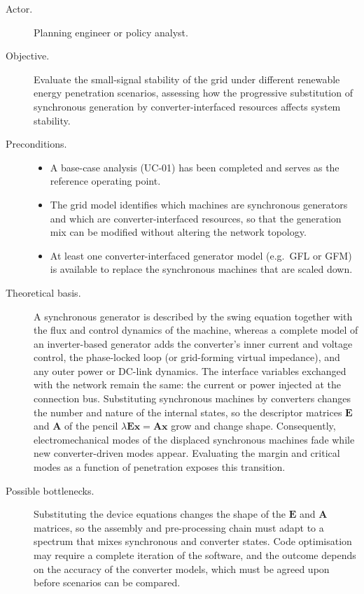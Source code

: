 \begin{description}
  \item[Actor.] Planning engineer or policy analyst.
  \item[Objective.] Evaluate the small-signal stability of the grid under different renewable energy penetration scenarios, assessing how the progressive substitution of synchronous generation by converter-interfaced resources affects system stability.
  \item[Preconditions.]
        \begin{itemize}[before=\leavevmode, leftmargin=*]
          \item A base-case analysis (UC-01) has been completed and serves as the reference operating point.
          \item The grid model identifies which machines are synchronous generators and which are converter-interfaced resources, so that the generation mix can be modified without altering the network topology.
          \item At least one converter-interfaced generator model (e.g.\ GFL or GFM) is available to replace the synchronous machines that are scaled down.
        \end{itemize}
  \item[Theoretical basis.] A synchronous generator is described by the swing equation together with the flux and control dynamics of the machine, whereas a complete model of an inverter-based generator adds the converter's inner current and voltage control, the phase-locked loop (or grid-forming virtual impedance), and any outer power or DC-link dynamics. The interface variables exchanged with the network remain the same: the current or power injected at the connection bus. Substituting synchronous machines by converters changes the number and nature of the internal states, so the descriptor matrices $\mathbf{E}$ and $\mathbf{A}$ of the pencil $\lambda\mathbf{E}\mathbf{x}=\mathbf{A}\mathbf{x}$ grow and change shape. Consequently, electromechanical modes of the displaced synchronous machines fade while new converter-driven modes appear. Evaluating the margin and critical modes as a function of penetration exposes this transition.
  \item[Possible bottlenecks.] Substituting the device equations changes the shape of the $\mathbf{E}$ and $\mathbf{A}$ matrices, so the assembly and pre-processing chain must adapt to a spectrum that mixes synchronous and converter states. Code optimisation may require a complete iteration of the software, and the outcome depends on the accuracy of the converter models, which must be agreed upon before scenarios can be compared.

\end{description}
